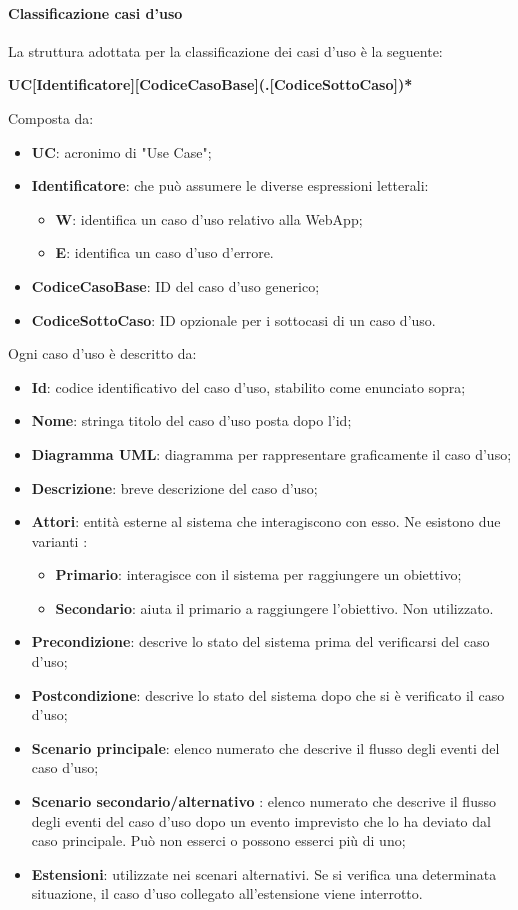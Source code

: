 \paragraph{Classificazione casi d'uso}
La struttura adottata per la classificazione dei casi d'uso è la seguente: \\
\centerline{\textbf{UC[Identificatore][CodiceCasoBase](.[CodiceSottoCaso])*}}
Composta da:
\begin{itemize}
\item \textbf{UC}: acronimo di "Use Case";
\item \textbf{Identificatore}: che può assumere le diverse espressioni letterali:
	\begin{itemize}
		\item \textbf{W}: identifica un caso d'uso relativo alla WebApp;
		\item \textbf{E}: identifica un caso d'uso d'errore.
	\end{itemize}
\item \textbf{CodiceCasoBase}: ID del caso d'uso generico;
\item \textbf{CodiceSottoCaso}: ID opzionale per i sottocasi di un caso d'uso.
\end{itemize}

Ogni caso d'uso è descritto da: 
\begin{itemize}
    \item \textbf{Id}: codice identificativo del caso d'uso, stabilito come enunciato sopra;
    \item \textbf{Nome}: stringa titolo del caso d'uso posta dopo l'id;
    \item \textbf{Diagramma UML}: diagramma per rappresentare graficamente il caso d'uso;
    \item \textbf{Descrizione}: breve descrizione del caso d'uso;
    \item \textbf{Attori}: entità esterne al sistema che interagiscono con esso. Ne esistono due varianti : 
    \begin{itemize}
    \item \textbf{Primario}: interagisce con il sistema per raggiungere un obiettivo;
    \item \textbf{Secondario}: aiuta il primario a raggiungere l'obiettivo. Non utilizzato.
    \end{itemize}
    \item \textbf{Precondizione}: descrive lo stato del sistema prima del verificarsi del caso d'uso;
    \item \textbf{Postcondizione}: descrive lo stato del sistema dopo che si è verificato il caso d'uso;
    \item \textbf{Scenario principale}: elenco numerato che descrive il flusso degli eventi del caso d'uso;
    \item \textbf{Scenario secondario/alternativo} : elenco numerato che descrive il flusso degli eventi del caso d'uso dopo un evento imprevisto che lo ha deviato dal caso principale. Può non esserci o possono esserci più di uno;
    \item \textbf{Estensioni}: utilizzate nei scenari alternativi. Se si verifica una determinata situazione, il caso d'uso collegato all'estensione viene interrotto.
\end{itemize}

